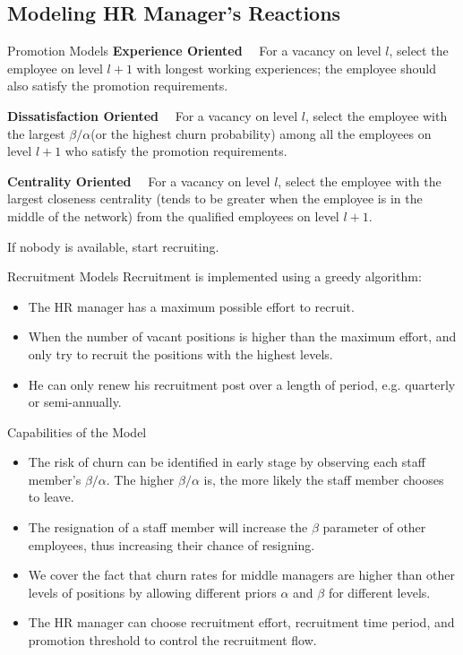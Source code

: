 \documentclass{beamer}
\begin{document}
\subsection{Modeling HR Manager's Reactions}
\begin{frame}{Promotion Models}
\textbf{Experience Oriented} \ \ For a vacancy on level $l$, select the employee on level $l+1$ with longest working experiences; the employee should also satisfy the promotion requirements. \vspace{0.5em}

\textbf{Dissatisfaction Oriented} \ \  For a vacancy on level $l$, select the employee with the largest $\beta / \alpha$(or the highest churn probability) among all the employees on level $l+1$ who satisfy the promotion requirements. \vspace{0.5em}

\textbf{Centrality Oriented} \ \ For a vacancy on level $l$, select the employee with the largest closeness centrality (tends to be greater when the employee is in the middle of the network) from the qualified employees on level $l+1$. \vspace{0.5em}

If nobody is available, start recruiting.

\end{frame}

\begin{frame}{Recruitment Models}
Recruitment is implemented using a greedy algorithm:
\begin{itemize}
\item The HR manager has a maximum possible effort to recruit.
\item When the number of vacant positions is higher than the maximum effort, and only try to recruit the positions with the highest levels.
\item He can only renew his recruitment post over a length of period, e.g. quarterly or semi-annually.
\end{itemize}
\end{frame}

\begin{frame}{Capabilities of the Model}
\begin{itemize}
\item The risk of churn can be identified in early stage by observing each staff member's $\beta/\alpha$. The higher $\beta/\alpha$ is, the more likely the staff member chooses to leave.
\item The resignation of a staff member will increase the $\beta$ parameter of other employees, thus increasing their chance of resigning.
\item We cover the fact that churn rates for middle managers are higher than other levels of positions by allowing different priors $\alpha$ and $\beta$ for different levels.
\item The HR manager can choose recruitment effort, recruitment time period, and promotion threshold to control the recruitment flow.
\end{itemize}
\end{frame}
\end{document}
